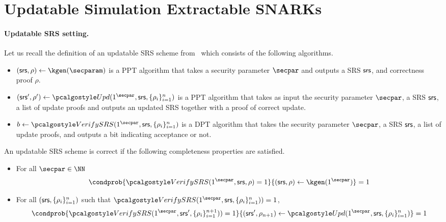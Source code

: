 

\section{Updatable Simulation Extractable SNARKs}

\paragraph{Updatable SRS setting.} Let us recall the definition of an updatable SRS scheme from~\cite{C:GKMMM18} which consists of the following algorithms.

\begin{itemize}
	\item
	$(\srs,\rho) \leftarrow \kgen(\secparam)$ is a PPT algorithm that takes a security parameter $\secpar$ and outputs a SRS $\mathsf{srs}$, and correctness proof $\rho$.
	\item
	$ (\srs',\rho') \leftarrow \upd(1^\secpar,\srs,\{\rho_i \}_{i=1}^n)$ is a PPT algorithm that takes as input the security parameter $\secpar$, a SRS $\mathsf{srs}$, a list of update proofs and outputs an updated SRS together with a proof of correct update. 
	\item
	$b \leftarrow \verifyCRS(1^\secpar,\srs,\{\rho_i \}_{i=1}^n)$ is a DPT algorithm that takes the security parameter $\secpar$, a SRS $\mathsf{srs}$, a list of update proofs, and outputs a bit indicating acceptance or not. 
\end{itemize}

\begin{definition}
	An updatable SRS scheme is correct if the following completeness properties are satisfied.
	
	\begin{itemize}
		
		\item
		For all $\secpar \in \NN$
		\[
		\condprob{\verifyCRS(1^\secpar,\srs,\rho) = 1}{(\srs,\rho) \leftarrow \kgen(1^\secpar)} = 1
		\]
		\item
		
		For all $(\mathsf{srs},\{\rho_i \}_{i=1}^n)$ such that $\verifyCRS(1^\secpar,\srs,\{\rho_i \}_{i=1}^n))=1$,
		\[
		\condprob{\verifyCRS(1^\secpar,\srs',\{\rho_i \}_{i=1}^{n+1}))=1}{(\srs',\rho_{n+1}) \leftarrow \upd(1^\secpar,\srs,\{\rho_i \}_{i=1}^n)} = 1
		\]
		
	\end{itemize}
\end{definition} 


